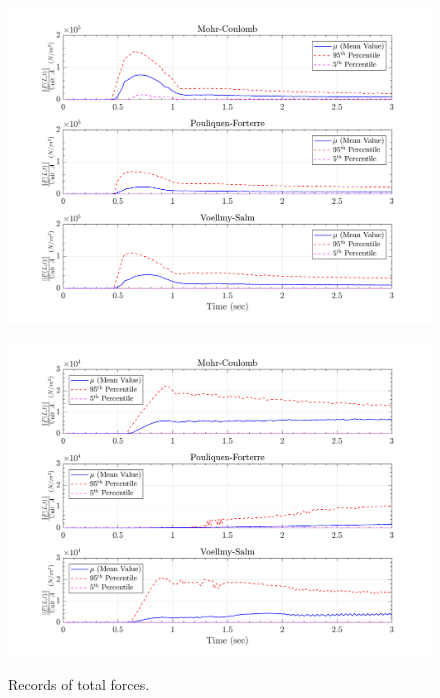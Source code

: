 \documentclass{article}
\begin{document}
\begin{figure}[H]
	\begin{minipage}[b]{0.5\linewidth}
    	\centering
    	\includegraphics[width=1\textwidth]{InclinedPlane/LocalRecords/Records/Ftotal_L15.png}
    	\label{fig:Ramp-L3-Ftot}
	\end{minipage}
	\begin{minipage}[b]{0.5\linewidth}
		\centering
		\includegraphics[width=1\textwidth]{InclinedPlane/LocalRecords/Records/Ftotal_L17.png}
    	\label{fig:Ramp-L4-Ftot}
    \end{minipage}
    \caption{Records of total forces.}
    \label{fig:Ramp-LM-Ftot}     
\end{figure}
\end{document}
